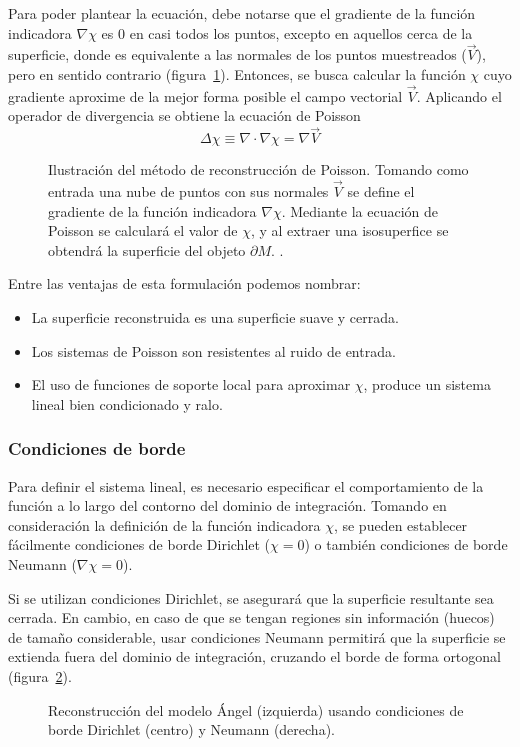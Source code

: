 Para poder plantear la ecuación, debe notarse que el gradiente de la función indicadora $\nabla \chi$
es 0 en casi todos los puntos, excepto en aquellos cerca de la superficie,
donde es equivalente a las normales de los puntos muestreados ($\vec{V}$), pero en sentido contrario (figura~\ref{fig:poiss_planteo}).
Entonces, se busca calcular la función $\chi$ cuyo gradiente aproxime de la mejor forma posible el
campo vectorial $\vec{V}$.
Aplicando  el operador de divergencia se obtiene la ecuación de Poisson
\[ \Delta\chi \equiv \nabla \cdot \nabla \chi = \nabla\vec{V} \]

\begin{figure}
	\centering
	
	\caption{\label{fig:poiss_planteo}Ilustración del método de reconstrucción de Poisson.
	Tomando como entrada una nube de puntos con sus normales $\vec{V}$ se define el gradiente de la función
	indicadora $\nabla \chi$. Mediante la ecuación de Poisson se calculará el valor de $\chi$,
	y al extraer una isosuperfice se obtendrá la superficie del objeto $\partial M$. 
	.
	}
\end{figure}

Entre las ventajas de esta formulación podemos nombrar:
\begin{itemize}
	\item La superficie reconstruida es una superficie suave y cerrada.
	\item Los sistemas de Poisson son resistentes al ruido de entrada.
	\item El uso de funciones de soporte local para aproximar $\chi$,
		produce un sistema lineal bien condicionado y ralo.\cite{Kazhdan:2006:PSR:1281957.1281965}
\end{itemize}

	\subsubsection{Condiciones de borde}
	Para definir el sistema lineal, es necesario especificar el
	comportamiento de la función a lo largo del contorno del dominio de
	integración.
	Tomando en consideración la definición de la función indicadora $\chi$,
	se pueden establecer fácilmente condiciones de borde Dirichlet ($\chi = 0$)
	o también condiciones de borde Neumann ($\nabla \chi = 0$).

	Si se utilizan condiciones Dirichlet, se asegurará que la superficie resultante sea cerrada.
	En cambio, en caso de que se tengan regiones sin información (huecos) de tamaño
	considerable, usar condiciones Neumann permitirá que la superficie se
	extienda fuera del dominio de integración, cruzando el borde de forma
	ortogonal (figura~\ref{fig:poisson_boundary})\cite{Kazhdan_screenedpoisson}.
	\begin{figure}
		\caption{\label{fig:poisson_boundary}Reconstrucción del modelo Ángel (izquierda) usando condiciones de borde Dirichlet (centro) y Neumann (derecha).}
	\end{figure}


